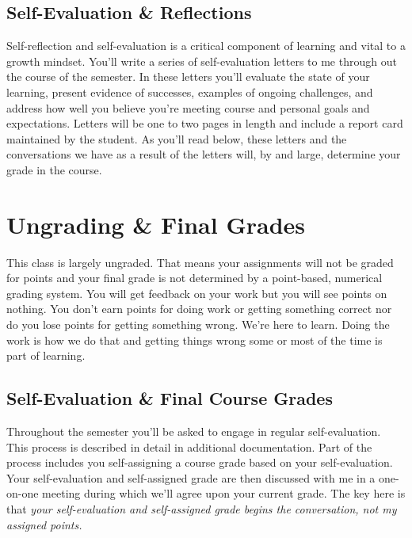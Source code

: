 \documentclass[10pt]{article}
\begin{document}
\subsection*{Self-Evaluation \& Reflections}

Self-reflection and self-evaluation is a critical component of learning and vital to a growth mindset. You'll write a series of self-evaluation letters to me through out the course of the semester. In these letters you'll evaluate the state of your learning, present evidence of successes, examples of ongoing challenges, and address how well you believe you're meeting course and personal goals and expectations. Letters will be one to two pages in length and include a report card maintained by the student. As you'll read below, these letters and the conversations we have as a result of the letters will, by and large, determine your grade in the course.



\section{Ungrading \& Final Grades}

This class is largely ungraded. That means your assignments will not be graded for points and your final grade is not determined by a point-based, numerical grading system. You will get feedback on your work but you will see points on nothing. You don't earn points for doing work or getting something correct nor do you lose points for getting something wrong. We're here to learn. Doing the work is how we do that and getting things wrong some or most of the time is part of learning.

\subsection{Self-Evaluation \& Final Course Grades}

Throughout the semester you'll be asked to engage in regular self-evaluation. This process is described in detail in additional documentation. Part of the process includes you self-assigning a course grade based on your self-evaluation. Your self-evaluation and self-assigned grade are then discussed with me in a one-on-one meeting during which we'll agree upon your current grade. The key here is that \textit{your self-evaluation and self-assigned grade begins the conversation, not my assigned points.}
\end{document}
